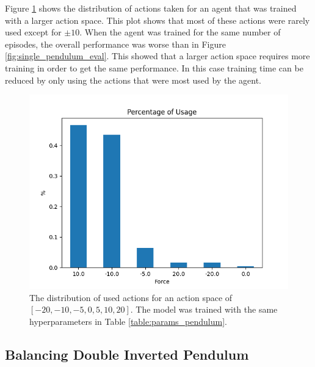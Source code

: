 \documentclass{LTHtwocol} %
\begin{document}
Figure \ref{fig:pendulum_force} shows the distribution of actions taken for an agent that was trained with a larger action space. This plot shows that most of these actions were rarely used except for $\pm 10$. When the agent was trained for the same number of episodes, the overall performance was worse than in Figure \ref{fig:single_pendulum_eval}. This showed that a larger action space requires more training in order to get the same performance. In this case training time can be reduced by only using the actions that were most used by the agent.
\begin{figure}[H]
	\centering
	\includegraphics[width=0.9\columnwidth]{figures/Pendulum_force.png}
	\caption{The distribution of used actions for an action space of $[-20,-10,-5,0,5,10,20]$. The model was trained with the same hyperparameters in Table \ref{table:params_pendulum}.}
	\label{fig:pendulum_force}
\end{figure}



\subsection{Balancing Double Inverted Pendulum}
\end{document}
